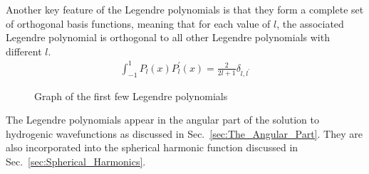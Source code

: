         \noindent Another key feature of the Legendre polynomials is that they form a complete set of orthogonal basis functions, meaning that for each value of $l$, the associated Legendre polynomial is orthogonal to all other Legendre polynomials with different $l$.
        \begin{align}
            \int_{-1}^1 P_l(x) P_l^\prime(x) = \frac{2}{2l + 1}\delta_{l,l^\prime}
        \end{align}
        \begin{figure}[ht!]
            \centering
            \resizebox{0.8\linewidth}{!}{}
            \caption{Graph of the first few Legendre polynomials}
            \label{img:Legendre_polynomials}
        \end{figure}
        \noindent The Legendre polynomials appear in the angular part of the solution to hydrogenic wavefunctions as discussed in Sec.~\ref{sec:The_Angular_Part}. They are also incorporated into the spherical harmonic function discussed in Sec.~\ref{sec:Spherical_Harmonics}.

